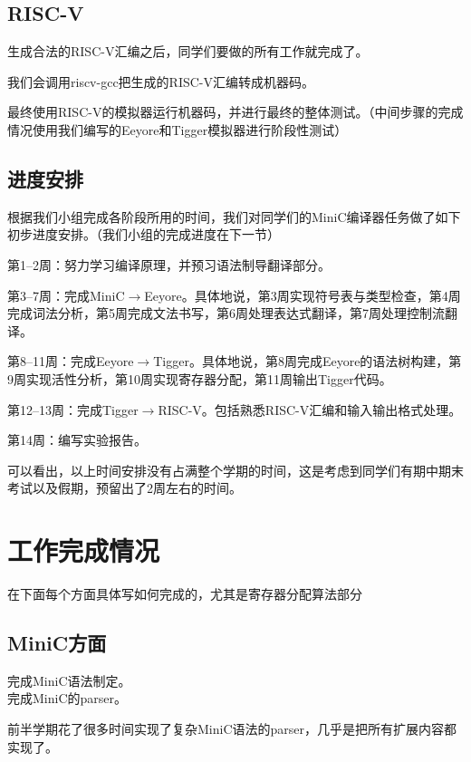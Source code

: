 \documentclass[a4paper]{ctexart}
\begin{document}
\subsection{RISC-V}

生成合法的RISC-V汇编之后，同学们要做的所有工作就完成了。

我们会调用riscv-gcc把生成的RISC-V汇编转成机器码。

最终使用RISC-V的模拟器运行机器码，并进行最终的整体测试。（中间步骤的完成情况使用我们编写的Eeyore和Tigger模拟器进行阶段性测试）

\subsection{进度安排}

根据我们小组完成各阶段所用的时间，我们对同学们的MiniC编译器任务做了如下初步进度安排。（我们小组的完成进度在下一节）

第1--2周：努力学习编译原理，并预习语法制导翻译部分。

第3--7周：完成MiniC$\rightarrow$Eeyore。具体地说，第3周实现符号表与类型检查，第4周完成词法分析，第5周完成文法书写，第6周处理表达式翻译，第7周处理控制流翻译。

第8--11周：完成Eeyore$\rightarrow$Tigger。具体地说，第8周完成Eeyore的语法树构建，第9周实现活性分析，第10周实现寄存器分配，第11周输出Tigger代码。

第12--13周：完成Tigger$\rightarrow$RISC-V。包括熟悉RISC-V汇编和输入输出格式处理。

第14周：编写实验报告。

可以看出，以上时间安排没有占满整个学期的时间，这是考虑到同学们有期中期末考试以及假期，预留出了2周左右的时间。

\newpage
\section{工作完成情况}

{\color{red}在下面每个方面具体写如何完成的，尤其是寄存器分配算法部分}

\subsection{MiniC方面}

\noindent 完成MiniC语法制定。
\\

\noindent 完成MiniC的parser。

前半学期花了很多时间实现了复杂MiniC语法的parser，几乎是把所有扩展内容都实现了。
\end{document}
